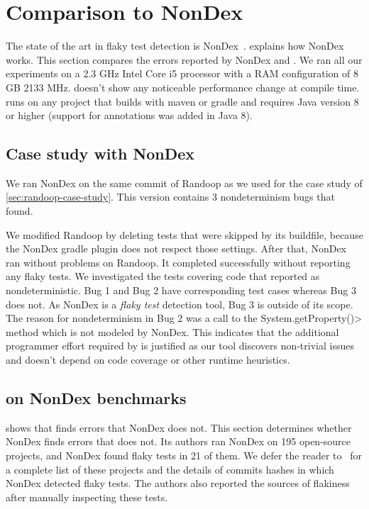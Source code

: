 \section{Comparison to NonDex}

The state of the art in flaky test detection is NonDex~\cite{nondex}.
 explains how NonDex works. This section compares the
errors reported by NonDex and \theDeterminismChecker. We ran all our
experiments on a 2.3 GHz Intel Core i5 processor with a RAM configuration of 8 GB 2133 MHz.
\TheDeterminismChecker doesn't show any noticeable performance change at compile time.
\TheDeterminismChecker runs on any project that builds with maven or gradle and requires
Java version 8 or higher (support for annotations was added in Java 8).

\subsection{Case study with NonDex}\label{sec:nondex-randoop}

We ran NonDex on the same commit of Randoop as we used for the case study
of \cref{sec:randoop-case-study}.  This version contains 3 nondeterminism bugs that
\theDeterminismChecker found.

We modified Randoop by deleting tests that were skipped by its buildfile,
because the NonDex gradle plugin does not respect those settings. 
After that, NonDex ran without problems on Randoop.
It completed successfully without reporting any flaky tests.
We investigated the tests covering code that \theDeterminismChecker reported as nondeterministic.
Bug 1 and Bug 2 have corresponding test cases whereas Bug 3 does not.
As NonDex is a \textit{flaky test} detection tool, Bug 3 is outside of its scope.
The reason for nondeterminism in Bug 2 was a call to the \<System.getProperty()> method which
is not modeled by NonDex.
This indicates that the additional programmer effort required by \TheDeterminismChecker is justified
as our tool discovers non-trivial issues and doesn't depend on code coverage or other runtime heuristics.

\subsection{\TheDeterminismChecker on NonDex benchmarks}\label{sec:nondex-benchmarks}

 shows that \theDeterminismChecker finds errors that NonDex does not.
This section determines whether NonDex finds errors that \theDeterminismChecker does not.
Its authors ran NonDex on 195 open-source projects, and NonDex found flaky tests in
21 of them. We defer the reader to~\cite{nondex} for a complete list of these projects
and the details of commits hashes in which NonDex detected flaky tests.
The authors also reported the sources of flakiness
after manually inspecting these tests. 

